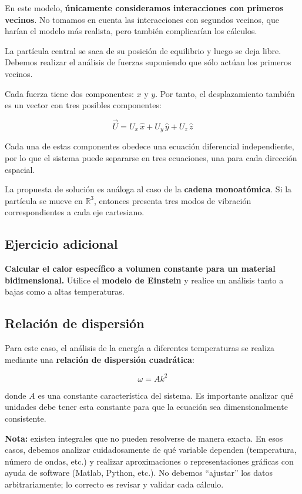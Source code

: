 \documentclass{article}
\begin{document}
En este modelo, \textbf{únicamente consideramos interacciones con primeros vecinos}.  
No tomamos en cuenta las interacciones con segundos vecinos, que harían el modelo más realista, pero también complicarían los cálculos.

La partícula central se saca de su posición de equilibrio y luego se deja libre.  
Debemos realizar el análisis de fuerzas suponiendo que sólo actúan los primeros vecinos.

Cada fuerza tiene dos componentes: \(x\) y \(y\).  
Por tanto, el desplazamiento también es un vector con tres posibles componentes:

\[
\vec{U} = U_{x}\,\hat{x} + U_{y}\,\hat{y} + U_{z}\,\hat{z}
\]

Cada una de estas componentes obedece una ecuación diferencial independiente, por lo que el sistema puede separarse en tres ecuaciones, una para cada dirección espacial.

La propuesta de solución es análoga al caso de la \textbf{cadena monoatómica}.  
Si la partícula se mueve en \(\mathbb{R}^{3}\), entonces presenta tres modos de vibración correspondientes a cada eje cartesiano.



\subsection*{Ejercicio adicional}

\textbf{Calcular el calor específico a volumen constante para un material bidimensional.}  
Utilice el \textbf{modelo de Einstein} y realice un análisis tanto a bajas como a altas temperaturas.


\subsection*{Relación de dispersión}

Para este caso, el análisis de la energía a diferentes temperaturas se realiza mediante una \textbf{relación de dispersión cuadrática}:

\[
\omega = A k^{2}
\]

donde \(A\) es una constante característica del sistema.  
Es importante analizar qué unidades debe tener esta constante para que la ecuación sea dimensionalmente consistente.


\textbf{Nota:} existen integrales que no pueden resolverse de manera exacta.  
En esos casos, debemos analizar cuidadosamente de qué variable dependen (temperatura, número de ondas, etc.) y realizar aproximaciones o representaciones gráficas con ayuda de software (Matlab, Python, etc.).  
No debemos “ajustar” los datos arbitrariamente; lo correcto es revisar y validar cada cálculo.
\end{document}
